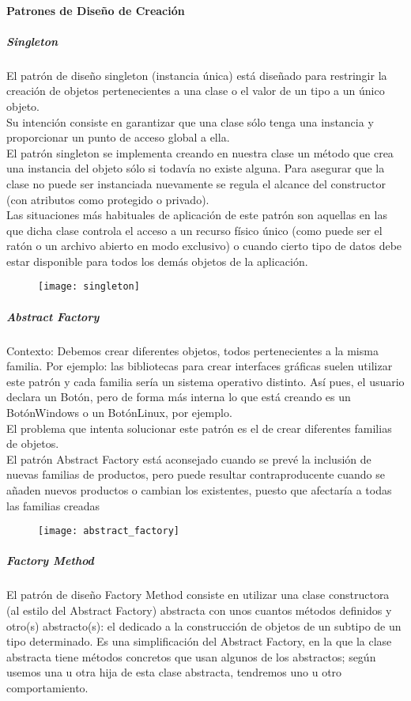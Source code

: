 \paragraph{Patrones de Diseño de Creación}
\subparagraph{Singleton}
El patrón de diseño singleton (instancia única) está diseñado para restringir la creación de objetos pertenecientes a una clase o el valor de un tipo a un único objeto.\\
Su intención consiste en garantizar que una clase sólo tenga una instancia y proporcionar un punto de acceso global a ella.\\
El patrón singleton se implementa creando en nuestra clase un método que crea una instancia del objeto sólo si todavía no existe alguna. Para asegurar que la clase no puede ser instanciada nuevamente se regula el alcance del constructor (con atributos como protegido o privado).\\
Las situaciones más habituales de aplicación de este patrón son aquellas en las que dicha clase controla el acceso a un recurso físico único (como puede ser el ratón o un archivo abierto en modo exclusivo) o cuando cierto tipo de datos debe estar disponible para todos los demás objetos de la aplicación.\\
\begin{figure}
  \centering
    \texttt{[image: singleton]}
\end{figure}
\subparagraph{Abstract Factory}
Contexto: Debemos crear diferentes objetos, todos pertenecientes a la misma familia. Por ejemplo: las bibliotecas para crear interfaces gráficas suelen utilizar este patrón y cada familia sería un sistema operativo distinto. Así pues, el usuario declara un Botón, pero de forma más interna lo que está creando es un BotónWindows o un BotónLinux, por ejemplo.\\
El problema que intenta solucionar este patrón es el de crear diferentes familias de objetos.\\
El patrón Abstract Factory está aconsejado cuando se prevé la inclusión de nuevas familias de productos, pero puede resultar contraproducente cuando se añaden nuevos productos o cambian los existentes, puesto que afectaría a todas las familias creadas\\
\begin{figure}[h!]
  \centering{}
    \texttt{[image: abstract\_factory]}
\end{figure}
\newpage
\subparagraph{Factory Method}
El patrón de diseño Factory Method consiste en utilizar una clase constructora (al estilo del Abstract Factory) abstracta con unos cuantos métodos definidos y otro(s) abstracto(s): el dedicado a la construcción de objetos de un subtipo de un tipo determinado. Es una simplificación del Abstract Factory, en la que la clase abstracta tiene métodos concretos que usan algunos de los abstractos; según usemos una u otra hija de esta clase abstracta, tendremos uno u otro comportamiento.
